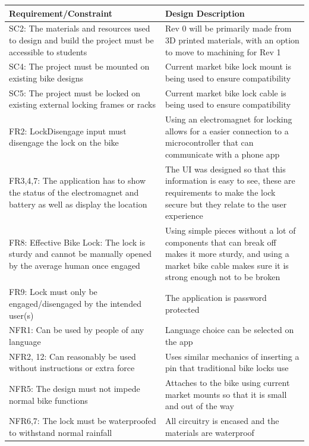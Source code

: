 \documentclass[12pt, titlepage]{article}
\begin{document}
\begin{minipage}{\textwidth}
\renewcommand*{\arraystretch}{1.5}
\begin{tabular}{| p{} | p{} | }
 \hline
 Requirement/Constraint & Design Description\\ 
 \hline
 SC2:  The materials and resources used to design and build the project must be accessible to students& Rev 0 will be primarily made from 3D printed materials, with an option to move to machining for Rev 1\\
 \hline
 SC4:  The project must be mounted on existing bike designs & Current market bike lock mount is being used to ensure compatibility\\
 \hline
 SC5:  The project must be locked on existing external locking frames or racks &Current market bike lock cable is being used to ensure compatibility\\
 \hline
FR2: LockDisengage input must disengage the lock on the bike & Using an electromagnet for locking allows for a easier connection to a microcontroller that can communicate with a phone app\\
 \hline
FR3,4,7: The application has to show the status of the electromagnet and battery as well as display the location&The UI was designed so that this information is easy to see, these are requirements to make the lock secure but they relate to the user experience\\
 \hline
FR8: Effective Bike Lock: The lock is sturdy and cannot be manually opened by the average human once engaged& Using simple pieces without a lot of components that can break off makes it more sturdy, and using a market bike cable makes sure it is strong enough not to be broken\\
 \hline
FR9: Lock must only be engaged/disengaged by the intended user(s)& The application is password protected\\
 \hline
NFR1: Can be used by people of any language&Language choice can be selected on the app\\
 \hline
NFR2, 12: Can reasonably be used without instructions or extra force& Uses similar mechanics of inserting a pin that traditional bike locks use\\
 \hline
NFR5: The design must not impede normal bike functions& Attaches to the bike using current market mounts so that it is small and out of the way\\
 \hline
NFR6,7: The lock must be waterproofed to withstand normal rainfall & All circuitry is encased and the materials are waterproof\\

\end{tabular}
\end{minipage}
\end{document}

